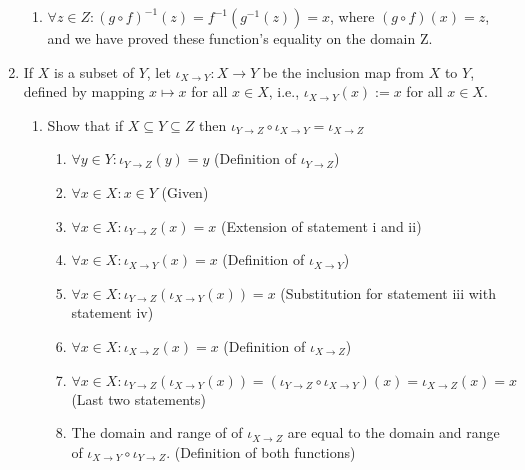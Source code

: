 \documentclass{article}
\begin{document}
\begin{enumerate}
\begin{enumerate}
                \item $\forall z \in Z: {(g \circ f)}^{-1}(z) = f^{-1}(g^{-1}(z)) = x$, where $(g \circ f)(x) = z$, and we have proved these function's equality on the domain Z.
            \end{enumerate}
        \item If $X$ is a subset of $Y$, let ${\iota}_{X \rightarrow Y}: X
            \rightarrow Y$ be the inclusion map from $X$ to $Y$, defined by
            mapping $x \mapsto x$ for all $x \in X$, i.e., ${\iota}_{X
            \rightarrow Y}(x) := x$ for all $x \in X$.
            \begin{enumerate}
                \item Show that if $X \subseteq Y \subseteq Z$ then ${\iota}_{Y
                    \rightarrow Z} \circ {\iota}_{X \rightarrow Y} = {\iota}_{X
                    \rightarrow Z}$
                    \begin{enumerate}
                        \item $\forall y \in Y: {\iota}_{Y \rightarrow Z}(y) = y$ (Definition of ${\iota}_{Y \rightarrow Z}$)
                        \item $\forall x \in X: x \in Y$ (Given)
                        \item $\forall x \in X: {\iota}_{Y \rightarrow Z}(x) = x$ (Extension of statement i and ii)
                        \item $\forall x \in X: {\iota}_{X \rightarrow Y}(x) = x$ (Definition of ${\iota}_{X \rightarrow Y}$)
                        \item $\forall x \in X: {\iota}_{Y \rightarrow Z}({\iota}_{X \rightarrow Y}(x)) = x$ (Substitution for statement iii with statement iv)
                        \item $\forall x \in X: {\iota}_{X \rightarrow Z}(x) = x$ (Definition of ${\iota}_{X \rightarrow Z}$)
                        \item $\forall x \in X: {\iota}_{Y \rightarrow
                            Z}({\iota}_{X \rightarrow Y}(x)) =  ({\iota}_{Y
                            \rightarrow Z} \circ {\iota}_{X \rightarrow Y})(x) =
                            {\iota}_{X \rightarrow Z}(x) = x$ (Last two statements)
                        \item The domain and range of of ${\iota}_{X
                            \rightarrow Z}$ are equal to the domain and range
                            of ${\iota}_{X \rightarrow Y} \circ {\iota}_{Y
                            \rightarrow Z}$. (Definition of both functions)

\end{enumerate}
\end{enumerate}
\end{enumerate}
\end{document}
